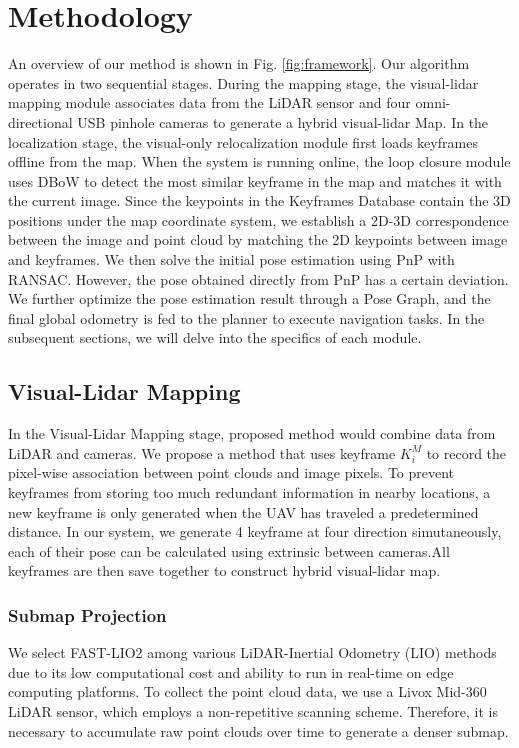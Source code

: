 \documentclass[conference]{./support/ieeeconf}
\begin{document}
\section{Methodology}
An overview of our method is shown in Fig. \ref{fig:framework}. 
Our algorithm operates in two sequential stages. During the mapping stage, the visual-lidar mapping module associates data from the LiDAR sensor and four omni-directional USB pinhole cameras to generate a hybrid visual-lidar Map. In the localization stage, the visual-only relocalization module first loads keyframes offline from the map. When the system is running online, the loop closure module uses DBoW to detect the most similar keyframe in the map and matches it with the current image. Since the keypoints in the Keyframes Database contain the 3D positions under the map coordinate system, we establish a 2D-3D correspondence between the image and point cloud by matching the 2D keypoints between image and keyframes. We then solve the initial pose estimation using PnP with RANSAC. However, the pose obtained directly from PnP has a certain deviation. We further optimize the pose estimation result through a Pose Graph, and the final global odometry is fed to the planner to execute navigation tasks.
In the subsequent sections, we will delve into the specifics of each module.
\subsection{Visual-Lidar Mapping}
In the Visual-Lidar Mapping stage, proposed method would combine data from LiDAR and cameras. We propose a method that uses keyframe $K^M_i$ to record the pixel-wise association between point clouds and image pixels. To prevent keyframes from storing too much redundant information in nearby locations, a new keyframe is only generated when the UAV has traveled a predetermined distance. In our system, we generate 4 keyframe at four direction simutaneously, each of their pose can be calculated using extrinsic between cameras.All keyframes are then save together to construct hybrid visual-lidar map.

\subsubsection{Submap Projection}
We select FAST-LIO2 \cite{xu2022fast} among various LiDAR-Inertial Odometry (LIO) methods due to its low computational cost and ability to run in real-time on edge computing platforms. To collect the point cloud data, we use a Livox Mid-360 LiDAR sensor, which employs a non-repetitive scanning scheme. Therefore, it is necessary to accumulate raw point clouds over time to generate a denser submap.
\end{document}
